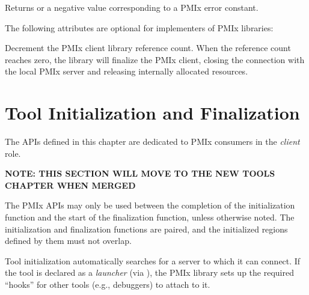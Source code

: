 \begin{arglist}
\end{arglist}

Returns  or a negative value corresponding to a PMIx error constant.

\optattrstart
The following attributes are optional for implementers of \ac{PMIx} libraries:

\optattrend

\descr

Decrement the \ac{PMIx} client library reference count.
When the reference count reaches zero, the library will finalize the \ac{PMIx} client, closing the connection with the local \ac{PMIx} server and releasing internally allocated resources.


\section{Tool Initialization and Finalization}
\label{chap:api_init:tool}

The \acp{API} defined in this chapter are dedicated to \ac{PMIx} consumers in the \emph{client} role.

\textbf{NOTE: THIS SECTION WILL MOVE TO THE NEW TOOLS CHAPTER WHEN MERGED}

The \ac{PMIx} \acp{API} may only be used between the completion of the initialization function and the start of the finalization function, unless otherwise noted.
The initialization and finalization functions are paired, and the initialized regions defined by them must not overlap.

\adviceuserstart
Tool initialization automatically searches for a server to which it can connect.
If the tool is declared as a \textit{launcher} (via ), the \ac{PMIx} library sets up the required ``hooks'' for other tools (e.g., debuggers) to attach to it.
\adviceuserend

\subsection{}

\summary

